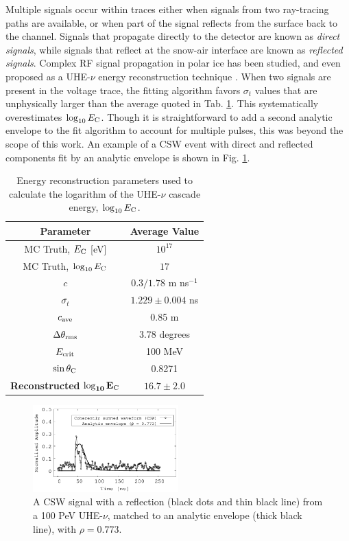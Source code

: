 \documentclass[amsmath,amssymb,aps,prd,10pt,twocolumn,showkeys]{revtex4}
\begin{document}
Multiple signals occur within traces either when signals from two ray-tracing paths are available, or when part of the signal reflects from the surface back to the channel.  Signals that propagate directly to the detector are known as \textit{direct signals}, while signals that reflect at the snow-air interface are known as \textit{reflected signals}.  Complex RF signal propagation in polar ice has been studied, and even proposed as a UHE-$\nu$ energy reconstruction technique \cite{Barwick:2018497,anker2019neutrino-734,deaconu2018measurements-182}.  When two signals are present in the voltage trace, the fitting algorithm favors $\sigma_t$ values that are unphysically larger than the average quoted in Tab. \ref{tab:2}.  This systematically overestimates $\log_{10} E_{\rm C}$.  Though it is straightforward to add a second analytic envelope to the fit algorithm to account for multiple pulses, this was beyond the scope of this work.  An example of a CSW event with direct and reflected components fit by an analytic envelope is shown in Fig. \ref{fig:example_waveforms_2}.

\begin{table}[hb]
\centering
\begin{tabular}{| c | c |}
\hline
\textbf{Parameter} & \textbf{Average Value} \\ \hline
MC Truth, $E_{\rm C}$ [eV] & $10^{17}$ \\
MC Truth, $\log_{10}E_{\rm C}$ & $17$ \\
$c$ & $0.3/1.78$ m ns$^{-1}$ \\
$\overline{\sigma_t}$ & $1.229 \pm 0.004$ ns \\
$c_{\rm ave}$ & 0.85 m \\
$\Delta\theta_{\rm rms}$ & $3.78$ degrees \\
$E_{\rm crit}$ & 100 MeV \\
$\sin\theta_{\rm C}$ & 0.8271 \\ \hline
\textbf{Reconstructed} $\mathbf{\log_{10}E_{\rm C}}$ & $16.7\pm 2.0$ \\
\hline
\end{tabular}
\caption{\label{tab:2} Energy reconstruction parameters used to calculate the logarithm of the UHE-$\nu$ cascade energy, $\log_{10}E_{\rm C}$.}
\end{table}

\begin{figure}
\centering
\includegraphics[width=0.5\textwidth]{Sept25_plot2.pdf}
\caption{\label{fig:example_waveforms_2} A CSW signal with a reflection (black dots and thin black line) from a 100 PeV UHE-$\nu$, matched to an analytic envelope (thick black line), with $\rho = 0.773$.}
\end{figure}
\end{document}
